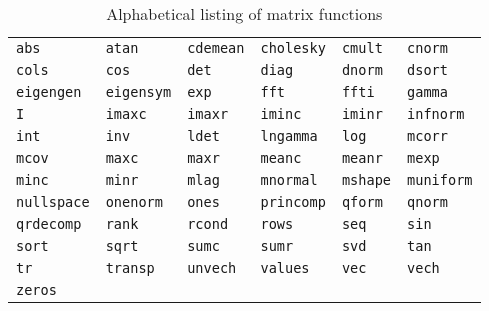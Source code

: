 \begin{table}[p]
\centering
\begin{tabular}{llllll}
\texttt{abs}       &
\texttt{atan}      &
\texttt{cdemean}   &
\texttt{cholesky}  &
\texttt{cmult}     &
\texttt{cnorm}     \\
\texttt{cols}      &
\texttt{cos}       &
\texttt{det}       &
\texttt{diag}      &
\texttt{dnorm}     &
\texttt{dsort}     \\
\texttt{eigengen}  &
\texttt{eigensym}  &
\texttt{exp}       &
\texttt{fft}       &
\texttt{ffti}      &
\texttt{gamma}     \\
\texttt{I}         &
\texttt{imaxc}     &
\texttt{imaxr}     &
\texttt{iminc}     &
\texttt{iminr}     &
\texttt{infnorm}   \\
\texttt{int}       &
\texttt{inv}       &
\texttt{ldet}      &
\texttt{lngamma}   &
\texttt{log}       &
\texttt{mcorr}     \\
\texttt{mcov}      &
\texttt{maxc}      &   
\texttt{maxr}      &
\texttt{meanc}     &
\texttt{meanr}     &
\texttt{mexp}      \\
\texttt{minc}      &  
\texttt{minr}      &
\texttt{mlag}      &
\texttt{mnormal}   &
\texttt{mshape}    &
\texttt{muniform}  \\
\texttt{nullspace} &
\texttt{onenorm}   &
\texttt{ones}      &
\texttt{princomp}  &
\texttt{qform}     &
\texttt{qnorm}     \\
\texttt{qrdecomp}  &
\texttt{rank}      &
\texttt{rcond}     &
\texttt{rows}      &
\texttt{seq}       &
\texttt{sin}       \\
\texttt{sort}      &
\texttt{sqrt}      &
\texttt{sumc}      &
\texttt{sumr}      &
\texttt{svd}       &
\texttt{tan}       \\
\texttt{tr}        &
\texttt{transp}    &
\texttt{unvech}    &
\texttt{values}    &
\texttt{vec}       &
\texttt{vech}      \\
\texttt{zeros}     
\end{tabular}      
\caption{Alphabetical listing of matrix functions}
\label{tab:matrix_funcs}
\end{table}

